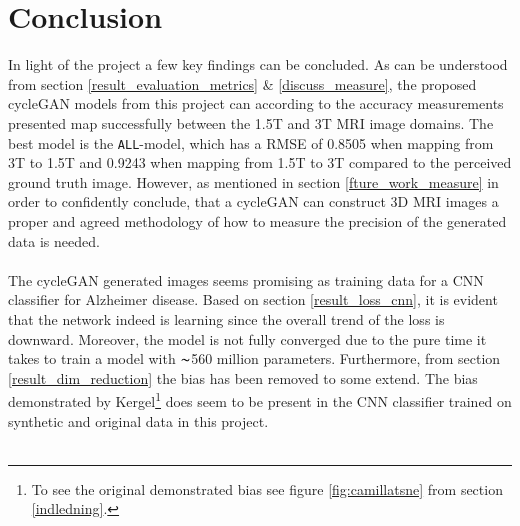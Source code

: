 \documentclass[12pt, fleqn, titlepage]{article}
\newcommand{\1}[1]{\mathds{1}\left[#1\right]}
\begin{document}
\section{Conclusion}\label{conclusion}

In light of the project a few key findings can be concluded. As can be understood from section \ref{result_evaluation_metrics} \& \ref{discuss_measure}, the proposed cycleGAN models from this project can according to the accuracy measurements presented map successfully between the 1.5T and 3T MRI image domains. The best model is the \texttt{ALL}-model, which has a RMSE of 0.8505 when mapping from 3T to 1.5T and 0.9243 when mapping from 1.5T to 3T compared to the perceived ground truth image. However, as mentioned in section \ref{fture_work_measure} in order to confidently conclude, that a cycleGAN can construct 3D MRI images a proper and agreed methodology of how to measure the precision of the generated data is needed. 
\\\\
%
The cycleGAN generated images seems promising as training data for a CNN classifier for Alzheimer disease. Based on section \ref{result_loss_cnn}, it is evident that the network indeed is learning since the overall trend of the loss is downward. Moreover, the model is not fully converged due to the pure time it takes to train a model with  $ \thicksim $560 million parameters. Furthermore, from section \ref{result_dim_reduction} the bias has been removed to some extend. The bias demonstrated by Kergel\footnote{To see the original demonstrated bias see figure \ref{fig:camillatsne} from section \ref{indledning}.} does seem to be present in the CNN classifier trained on synthetic and original data in this project. 
\\\\
\end{document}
